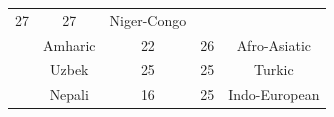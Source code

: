 {\begin{tabular}{|c|c|c|c|c|}
27 &
	

27 &
	

Niger-Congo \\
	\thetablecount\stepcounter{tablecount} &

Amharic &
	

22 &
	

26 &
	

Afro-Asiatic \\
	\thetablecount\stepcounter{tablecount} &

Uzbek &
	

25 &
	

25 &
	

Turkic \\
	\thetablecount\stepcounter{tablecount} &

Nepali &
	

16 &
	

25 &
	

Indo-European \\
\end{tabular}
}

